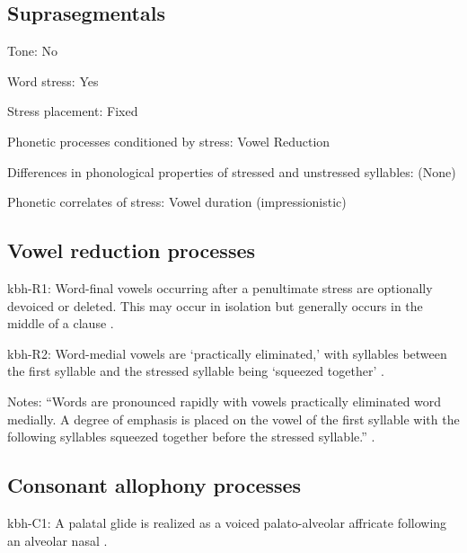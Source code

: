 {\subsection*{Suprasegmentals}
\begin{appendixdesc}
\item[Tone:] No

\item[Word stress:] Yes

\item[Stress placement:] Fixed

\item[Phonetic processes conditioned by stress:] Vowel Reduction

\item[Differences in phonological properties of stressed and unstressed syllables:] (None)

\item[Phonetic correlates of stress:] Vowel duration (impressionistic)
\end{appendixdesc}
\subsection*{Vowel reduction processes}
\begin{appendixdesc}

\item[kbh-R1:] Word-final vowels occurring after a penultimate stress are optionally devoiced or deleted. This may occur in isolation but generally occurs in the middle of a clause \citep[86]{Howard1967}.

\item[kbh-R2:] Word-medial vowels are ‘practically eliminated,’ with syllables between the first syllable and the stressed syllable being ‘squeezed together’ \citep[86--87]{Howard1967}.

\item[Notes:] “Words are pronounced rapidly with vowels practically eliminated word medially. A degree of emphasis is placed on the vowel of the first syllable with the following syllables squeezed together before the stressed syllable.” \citep[86--87]{Howard1967}.
\end{appendixdesc}
\subsection*{Consonant allophony processes}
\begin{appendixdesc}

\item[kbh-C1:] A palatal glide is realized as a voiced palato-alveolar affricate following an alveolar nasal \citep{Howard1967}.


\end{appendixdesc}}
